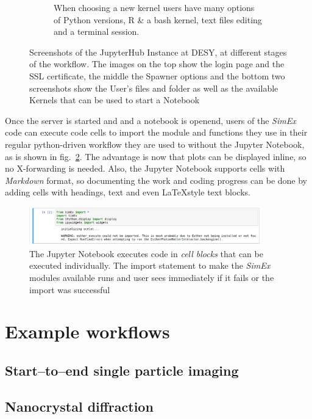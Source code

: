 \documentclass[10pt]{scrartcl}
\begin{document}
\begin{figure}
\begin{subfigure}{0.45\textwidth}
	  \caption{When choosing a new kernel users have many options of Python versions, R \& a bash kernel, text files editing and a terminal session.} %
  \end{subfigure}
  \caption{Screenshots of the JupyterHub Instance at DESY, at different stages of the workflow. The images on the top show the login page and the SSL certificate, the middle the Spawner options and the bottom two screenshots show the User's files and folder as well as the available Kernels that can be used to start a Notebook}
  \label{fig:jhub_work}
\end{figure}
%
Once the server is started and and a notebook is openend, users of the \textit{SimEx} code can execute code cells
to import the module and functions they use in their regular python-driven workflow they are used to without the Jupyter Notebook, as is shown in fig.~\ref{fig:simex_import}.
The advantage is now that plots can be displayed inline, so no X-forwarding is needed.
Also, the Jupyter Notebook supports cells with \textit{Markdown} format, so documenting the work and coding progress
can be done by adding cells with headings, text and even \LaTeX style text blocks.
%
\begin{figure}
 \centering
 \includegraphics[width=0.9\textwidth]{figures/simex_import_jhub.png}
 \caption{The Jupyter Notebook executes code in \textit{cell blocks} that can be executed individually. The import statement to make the \textit{SimEx} modules available runs and user sees immediately if it fails or the import was successful}
 \label{fig:simex_import}
\end{figure}
%
\FloatBarrier
\printbibliography[title={References}]
%
%
%
%
\FloatBarrier
\appendix
\section{Example workflows}
\label{appendix:notebooks}
\subsection{Start--to--end single particle imaging}

%
\subsection{Nanocrystal diffraction}

%
\end{document}
